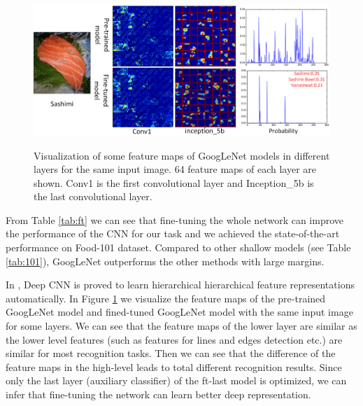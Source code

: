 \begin{figure}[htbp]
  \centering
  \includegraphics[scale=0.5]{fig/sashimi.png}\\
  \caption{Visualization of some feature maps of GoogLeNet models in different layers for the same input image. 64 feature maps of each layer are shown. Conv1 is the first convolutional layer and Inception\_5b is the last convolutional layer. }
   \label{fig:sashimi}
\end{figure}
From Table \ref{tab:ft} we can see that fine-tuning the whole network can improve the performance of the CNN for our task and we achieved the state-of-the-art performance on Food-101 dataset. Compared to other shallow models (see Table \ref{tab:101}), GoogLeNet outperforms the other methods with large margins.

In \cite{farabet2013learning}, Deep CNN is proved to learn hierarchical hierarchical feature representations automatically.
In Figure \ref{fig:sashimi} we visualize the feature maps of the pre-trained GoogLeNet model and fined-tuned GoogLeNet model with the same input image for some layers. We can see that the feature maps of the lower layer are similar as the lower level features (such as features for lines and edges detection etc.) are similar for most recognition tasks.
Then we can see that the difference of the feature maps in the high-level leads to total different recognition results.
Since only the last layer (auxiliary classifier) of the ft-last model is optimized, we can infer that fine-tuning the network can learn better deep representation.

